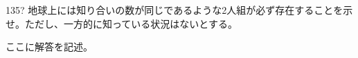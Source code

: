 \begin{thm}{135}{\hosi ?}{}
 地球上には知り合いの数が同じであるような2人組が必ず存在することを示せ。ただし、一方的に知っている状況はないとする。
\end{thm}

ここに解答を記述。